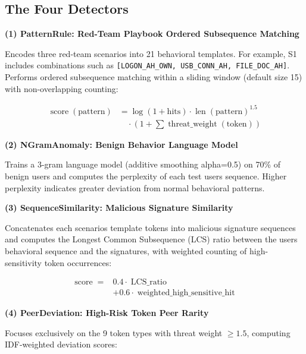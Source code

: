 \documentclass[
  a4paper,
  11pt]{article}
\begin{document}
\subsection{The Four Detectors}\label{the-four-detectors}

\textbf{(1) PatternRule: Red-Team Playbook Ordered Subsequence Matching}

Encodes three red-team scenarios into 21 behavioral templates. For
example, S1 includes combinations such as
\texttt{{[}LOGON\_AH\_OWN,\ USB\_CONN\_AH,\ FILE\_DOC\_AH{]}}. Performs
ordered subsequence matching within a sliding window (default size 15)
with non-overlapping counting:

\begin{equation}
\begin{aligned}
\operatorname{score}(\mathrm{pattern})
&= \log(1 + \mathrm{hits})
   \cdot \operatorname{len}(\mathrm{pattern})^{1.5} \\
&\quad \cdot \left(
1 + \sum \operatorname{threat\_weight}(\mathrm{token})
\right)
\end{aligned}
\end{equation}

\textbf{(2) NGramAnomaly: Benign Behavior Language Model}

Trains a 3-gram language model (additive smoothing alpha=0.5) on 70\% of
benign users and computes the perplexity of each test
user\textquotesingle s sequence. Higher perplexity indicates greater
deviation from normal behavioral patterns.

\textbf{(3) SequenceSimilarity: Malicious Signature Similarity}

Concatenates each scenario\textquotesingle s template tokens into
malicious signature sequences and computes the Longest Common
Subsequence (LCS) ratio between the user\textquotesingle s behavioral
sequence and the signatures, with weighted counting of high-sensitivity
token occurrences:

\begin{equation}
\begin{aligned}
\operatorname{score} =
&0.4 \cdot \operatorname{LCS\_ratio} \\
&+ 0.6 \cdot \operatorname{weighted\_high\_sensitive\_hit}
\end{aligned}
\end{equation}

\textbf{(4) PeerDeviation: High-Risk Token Peer Rarity}

Focuses exclusively on the 9 token types with threat weight
$\ge 1.5$, computing IDF-weighted deviation scores:
\end{document}
